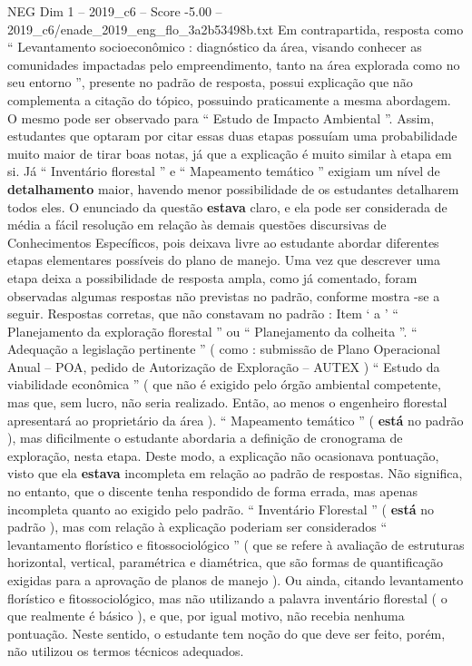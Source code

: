 \begin{textsample}{NEG Dim 1 – 2019\_c6 – Score -5.00 – 2019\_c6/enade\_2019\_eng\_flo\_3a2b53498b.txt}
Em contrapartida, resposta como “ Levantamento socioeconômico : diagnóstico da área, visando conhecer as comunidades impactadas pelo empreendimento, tanto na área explorada como no seu entorno ”, presente no padrão de resposta, possui explicação que não complementa a citação do tópico, possuindo praticamente a mesma abordagem.
O mesmo pode ser observado para “ Estudo de Impacto Ambiental ”.
Assim, estudantes que optaram por citar essas duas etapas possuíam uma probabilidade muito maior de tirar boas notas, já que a explicação é muito similar à etapa em si.
Já “ Inventário florestal ” e “ Mapeamento temático ” exigiam um nível de \textbf{detalhamento} maior, havendo menor possibilidade de os estudantes detalharem todos eles.
O enunciado da questão \textbf{estava} claro, e ela pode ser considerada de média a fácil resolução em relação às demais questões discursivas de Conhecimentos Específicos, pois deixava livre ao estudante abordar diferentes etapas elementares possíveis do plano de manejo.
Uma vez que descrever uma etapa deixa a possibilidade de resposta ampla, como já comentado, foram observadas algumas respostas não previstas no padrão, conforme mostra -se a seguir.
Respostas corretas, que não constavam no padrão : Item ‘ a ’ “ Planejamento da exploração florestal ” ou “ Planejamento da colheita ”. “ Adequação a legislação pertinente ” ( como : submissão de Plano Operacional Anual – POA, pedido de Autorização de Exploração – AUTEX ) “ Estudo da viabilidade econômica ” ( que não é exigido pelo órgão ambiental competente, mas que, sem lucro, não seria realizado.
Então, ao menos o engenheiro florestal apresentará ao proprietário da área ). “ Mapeamento temático ” ( \textbf{está} no padrão ), mas dificilmente o estudante abordaria a definição de cronograma de exploração, nesta etapa.
Deste modo, a explicação não ocasionava pontuação, visto que ela \textbf{estava} incompleta em relação ao padrão de respostas.
Não significa, no entanto, que o discente tenha respondido de forma errada, mas apenas incompleta quanto ao exigido pelo padrão. “ Inventário Florestal ” ( \textbf{está} no padrão ), mas com relação à explicação poderiam ser considerados “ levantamento florístico e fitossociológico ” ( que se refere à avaliação de estruturas horizontal, vertical, paramétrica e diamétrica, que são formas de quantificação exigidas para a aprovação de planos de manejo ).
Ou ainda, citando levantamento florístico e fitossociológico, mas não utilizando a palavra inventário florestal ( o que realmente é básico ), e que, por igual motivo, não recebia nenhuma pontuação.
Neste sentido, o estudante tem noção do que deve ser feito, porém, não utilizou os termos técnicos adequados.

\end{textsample}
